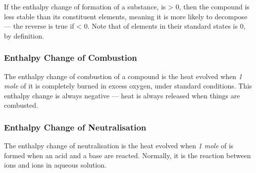 
				If the enthalpy change of formation of a substance,  is > 0, then the compound is less stable than its constituent elements,
				meaning it is more likely to decompose --- the reverse is true if  < 0. Note that  of elements in their standard
				states is 0, by definition.


			\subsubsection{Enthalpy Change of Combustion}
				The enthalpy change of combustion of a compound is the heat evolved when \emph{1 mole} of it is completely burned in excess
				oxygen, under standard conditions. This enthalpy change is always negative --- heat is always released when things are combusted.



			\subsubsection{Enthalpy Change of Neutralisation}

				The enthalpy change of neutralisation is the heat evolved when \emph{1 mole} of  is formed when an acid and a base are
				reacted. Normally, it is the reaction between  ions and  ions in aqueous solution.



